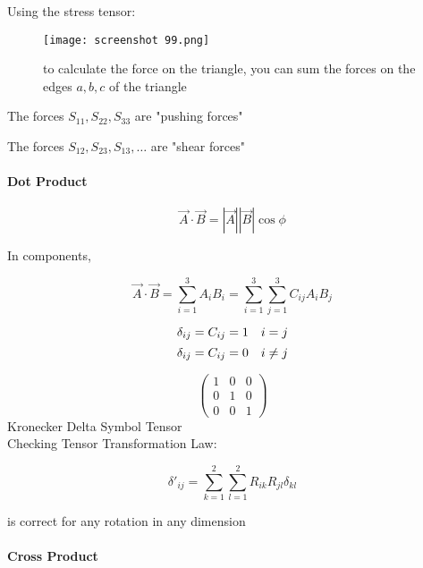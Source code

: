 \documentclass[svgnames]{article}   	%
\begin{document}
Using the stress tensor: 

\begin{figure}[H]
  \centering
    \texttt{[image: screenshot 99.png]}
    \caption{to calculate the force on the triangle, you can sum the forces on
    the edges $a,b,c$ of the triangle}
\end{figure}



The forces $S_{11}, S_{22}, S_{33}$ are "pushing forces"  

The forces $S_{12}, S_{23}, S_{13}, \dots$ are "shear forces" 

\paragraph{Dot Product} 

\[
  \vec{A} \cdot \vec{B} = |\vec{A}||\vec{B}|\cos\phi 
\]

In components, 

\vspace{5px} \[
  \vec{A} \cdot \vec{B} = \sum_{i=1}^{3} A_i B_i = \sum_{i=1}^3 \sum_{j=1}^3
  C_{ij} A_i B_j 
\] \vspace{5px}

\[
  \delta_{ij} =  C_{ij} = 1 \hspace{10px} i = j 
\]
\[
  \delta_{ij} = C_{ij} = 0 \hspace{10px} i \neq j
\]

\[
\begin{pmatrix} 
1 & 0 & 0 \\
0 & 1 & 0 \\
0 & 0 & 1 
\end{pmatrix} 
\]
Kronecker Delta Symbol Tensor 
\mbox{}\\

Checking Tensor Transformation Law: 

\[
  \delta'_{ij} = \sum_{k=1}^2\sum_{l=1}^2 R_{ik} R_{jl} \delta_{kl}
\]

is correct for any rotation in any dimension



\paragraph{Cross Product} 
\end{document}
